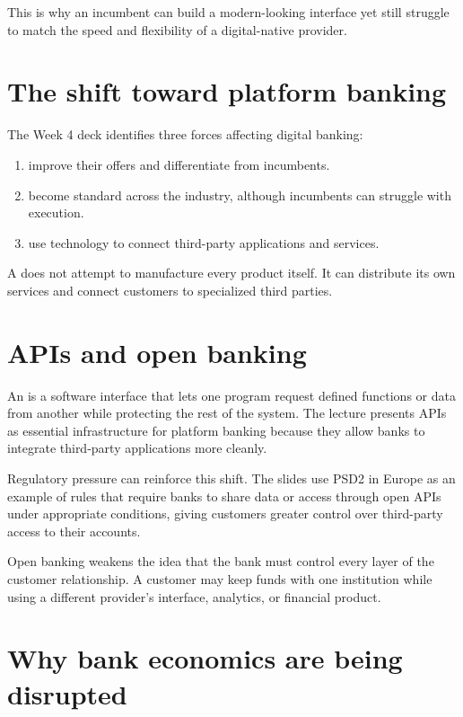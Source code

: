 This is why an incumbent can build a modern-looking interface yet still struggle to match the speed and flexibility of a digital-native provider.

\section{The shift toward platform banking}

The Week 4 deck identifies three forces affecting digital banking:

\begin{enumerate}
  \item {} improve their offers and differentiate from incumbents.
  \item {} become standard across the industry, although incumbents can struggle with execution.
  \item {} use technology to connect third-party applications and services.
\end{enumerate}

A  does not attempt to manufacture every product itself. It can distribute its own services and connect customers to specialized third parties.

\section{APIs and open banking}

An  is a software interface that lets one program request defined functions or data from another while protecting the rest of the system. The lecture presents APIs as essential infrastructure for platform banking because they allow banks to integrate third-party applications more cleanly.

Regulatory pressure can reinforce this shift. The slides use PSD2 in Europe as an example of rules that require banks to share data or access through open APIs under appropriate conditions, giving customers greater control over third-party access to their accounts.

\begin{keyidea}
Open banking weakens the idea that the bank must control every layer of the customer relationship. A customer may keep funds with one institution while using a different provider's interface, analytics, or financial product.
\end{keyidea}

\section{Why bank economics are being disrupted}


